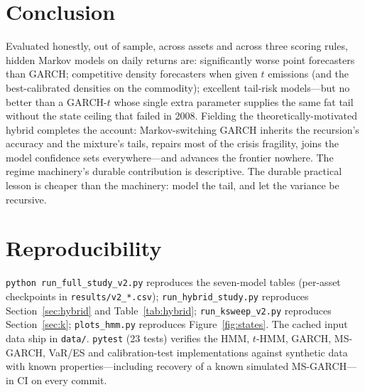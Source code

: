 \documentclass[11pt]{article}
\begin{document}
\section{Conclusion}
Evaluated honestly, out of sample, across assets and across three scoring
rules, hidden Markov models on daily returns are: significantly worse
point forecasters than GARCH; competitive density forecasters when given
$t$ emissions (and the best-calibrated densities on the commodity);
excellent tail-risk models---but no better than a GARCH-$t$ whose single
extra parameter supplies the same fat tail without the state ceiling that
failed in 2008. Fielding the theoretically-motivated hybrid completes the
account: Markov-switching GARCH inherits the recursion's accuracy and the
mixture's tails, repairs most of the crisis fragility, joins the model
confidence sets everywhere---and advances the frontier nowhere. The regime
machinery's durable contribution is descriptive. The durable practical
lesson is cheaper than the machinery: model the tail, and let the variance
be recursive.

\section*{Reproducibility}
\texttt{python run\_full\_study\_v2.py} reproduces the seven-model tables
(per-asset checkpoints in \texttt{results/v2\_*.csv});
\texttt{run\_hybrid\_study.py} reproduces Section~\ref{sec:hybrid} and
Table~\ref{tab:hybrid}; \texttt{run\_ksweep\_v2.py} reproduces
Section~\ref{sec:k}; \texttt{plots\_hmm.py} reproduces
Figure~\ref{fig:states}. The cached input data ship in \texttt{data/}.
\texttt{pytest} (23 tests) verifies the HMM, $t$-HMM, GARCH, MS-GARCH,
VaR/ES and calibration-test implementations against synthetic data with
known properties---including recovery of a known simulated MS-GARCH---in
CI on every commit.
\end{document}
